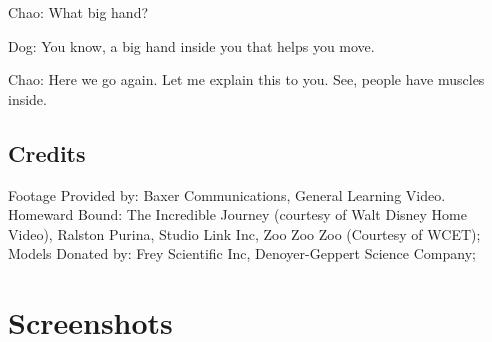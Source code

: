 Chao: What big hand?

Dog: You know, a big hand inside you that helps you move.

Chao: Here we go again. Let me explain this to you. See, people have muscles inside.

\subsection{Credits}

Footage Provided by: Baxer Communications, General Learning Video. Homeward Bound: The Incredible Journey (courtesy of Walt Disney Home Video), Ralston Purina, Studio Link Inc, Zoo Zoo Zoo (Courtesy of WCET);
Models Donated by: Frey Scientific Inc, Denoyer-Geppert Science Company;

\clearpage
\newpage

\section{Screenshots}

